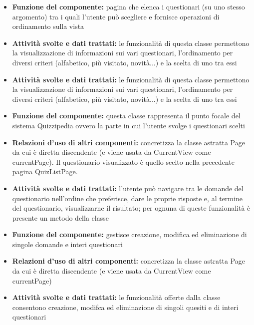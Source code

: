 \rigaregistro{0.0.17}{Luca Alessio (Progettista)}{12/05/2016}{Termine stesura sezione diagrammi e revisione/ampliamento di vari paragrafi}\documentclass[a4paper,11pt]{article}
\begin{document}
			\begin{itemize}
		    \item\textbf{Funzione del componente:} pagina che elenca i questionari (su uno stesso argomento) tra i quali l'utente può scegliere e fornisce operazioni di ordinamento sulla vista
		    \item\textbf{Attività svolte e dati trattati:} le funzionalità di questa classe permettono la visualizzazione di informazioni sui vari questionari, l'ordinamento per diversi criteri (alfabetico, più visitato, novità...) e la scelta di uno tra essi
			\item\textbf{Attività svolte e dati trattati:} le funzionalità di questa classe permettono la visualizzazione di informazioni sui vari questionari, l'ordinamento per diversi criteri (alfabetico, più visitato, novità...) e la scelta di uno tra essi
			\end{itemize}
			\begin{itemize}
		    \item\textbf{Funzione del componente:} questa classe rappresenta il punto focale del sistema Quizzipedia ovvero la parte in cui l'utente svolge i questionari scelti
			\item\textbf{Relazioni d'uso di altri componenti:} concretizza la classe astratta Page da cui è diretta discendente (e viene usata da CurrentView come currentPage). Il questionario visualizzato è quello scelto nella precedente pagina QuizListPage.
			\item\textbf{Attività svolte e dati trattati:} l'utente può navigare tra le domande del questionario nell'ordine che preferisce, dare le proprie risposte e, al termine del questionario, visualizzarne il risultato; per ognuna di queste funzionalità è presente un metodo della classe
			\end{itemize}
			\begin{itemize}
		    \item\textbf{Funzione del componente:} gestisce creazione, modifica ed eliminazione di singole domande e interi questionari
			\item\textbf{Relazioni d'uso di altri componenti:} concretizza la classe astratta Page da cui è diretta discendente (e viene usata da CurrentView come currentPage)
			\item\textbf{Attività svolte e dati trattati:} le funzionalità offerte dalla classe consentono creazione, modifca ed eliminazione di singoli quesiti e di interi questionari
			\end{itemize}
\end{document}
